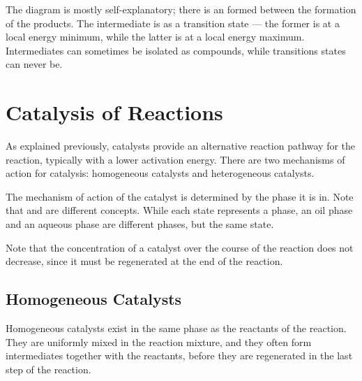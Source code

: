 				The diagram is mostly self-explanatory; there is an  formed between the formation of the products.
				The intermediate is  as a transition state --- the former is at a local energy minimum, while the latter
				is at a local energy maximum. Intermediates can sometimes be isolated as compounds, while transitions states can never be.













	\pagebreak
	\section{Catalysis of Reactions}

		As explained previously, catalysts provide an alternative reaction pathway for the reaction, typically with a lower activation energy.
		There are two mechanisms of action for catalysis: homogeneous catalysts and heterogeneous catalysts.

		The mechanism of action of the catalyst is determined by the phase it is in. Note that  and  are
		different concepts. While each state represents a phase, an oil phase and an aqueous phase are different phases, but the same state.

		Note that the concentration of a catalyst over the course of the reaction does not decrease, since it must be regenerated at the end of
		the reaction.


		\subsection{Homogeneous Catalysts}

			Homogeneous catalysts exist in the same phase as the reactants of the reaction. They are uniformly mixed in the reaction mixture,
			and they often form intermediates together with the reactants, before they are regenerated in the last step of the reaction.


